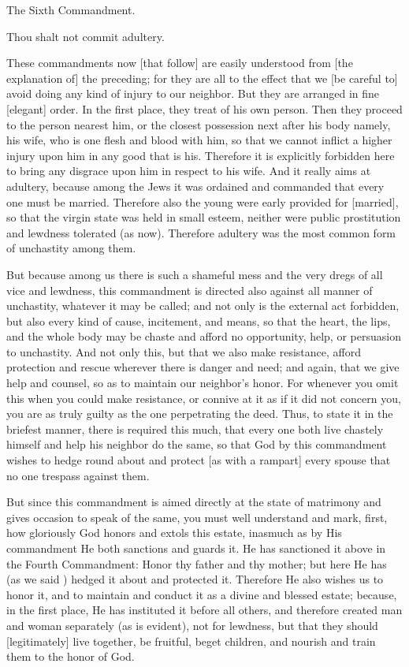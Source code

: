 The Sixth Commandment.

Thou shalt not commit adultery.

These commandments now [that follow] are easily understood from [the
explanation of] the preceding; for they are all to the effect that we
[be careful to] avoid doing any kind of injury to our neighbor. But
they are arranged in fine [elegant] order. In the first place, they
treat of his own person. Then they proceed to the person nearest him,
or the closest possession next after his body namely, his wife, who is
one flesh and blood with him, so that we cannot inflict a higher injury
upon him in any good that is his. Therefore it is explicitly forbidden
here to bring any disgrace upon him in respect to his wife. And it
really aims at adultery, because among the Jews it was ordained and
commanded that every one must be married. Therefore also the young were
early provided for [married], so that the virgin state was held in
small esteem, neither were public prostitution and lewdness tolerated
(as now). Therefore adultery was the most common form of unchastity
among them.

But because among us there is such a shameful mess and the very dregs
of all vice and lewdness, this commandment is directed also against all
manner of unchastity, whatever it may be called; and not only is the
external act forbidden, but also every kind of cause, incitement, and
means, so that the heart, the lips, and the whole body may be chaste
and afford no opportunity, help, or persuasion to unchastity. And not
only this, but that we also make resistance, afford protection and
rescue wherever there is danger and need; and again, that we give help
and counsel, so as to maintain our neighbor's honor. For whenever you
omit this when you could make resistance, or connive at it as if it did
not concern you, you are as truly guilty as the one perpetrating the
deed. Thus, to state it in the briefest manner, there is required this
much, that every one both live chastely himself and help his neighbor
do the same, so that God by this commandment wishes to hedge round
about and protect [as with a rampart] every spouse that no one trespass
against them.

But since this commandment is aimed directly at the state of matrimony
and gives occasion to speak of the same, you must well understand and
mark, first, how gloriously God honors and extols this estate, inasmuch
as by His commandment He both sanctions and guards it. He has
sanctioned it above in the Fourth Commandment: Honor thy father and thy
mother; but here He has (as we said ) hedged it about and protected it.
Therefore He also wishes us to honor it, and to maintain and conduct it
as a divine and blessed estate; because, in the first place, He has
instituted it before all others, and therefore created man and woman
separately (as is evident), not for lewdness, but that they should
[legitimately] live together, be fruitful, beget children, and nourish
and train them to the honor of God.

